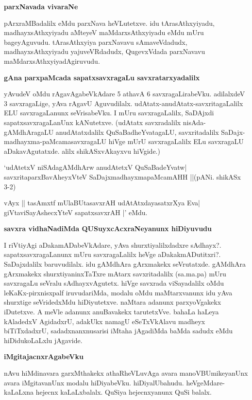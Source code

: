 \textbf{parxNavada vivaraNe} %

pArxraMBadalilx eMdu parxNava heVLutetxve. idu tArasAthxyiyadu, madhayxsAthxyiyadu aMteyeV maMdarxsAthxyiyadu eMdu mUru bageyAguvudu. tArasAthxyiya parxNavavu sAmaveVdadudx, madhayxsAthxyiyadu yajuveVRdadudx, QugevxVdada parxNavavu maMdarxsAthxyiyadAgiruvudu.

\textbf{gAna parxpaMcada sapatxsavxragaLu savxratarxyadalilx}

yAvudeV oMdu rAgavAgabeVkAdare 5 athavA 6 savxragaLirabeVku. adilalxdeV 3 savxragaLige, yAva rAgavU Aguvudilalx. udAtatx-anudAtatx-savxritagaLalilx ELU savxragaLanunx seVrisabeVku. I mUru savxragaLalilx, SaDAjxdi sapatxsavxragaLanUnx kANutetxve. (udAtatx savxradalilx nisAda-gAMdhAragaLU anudAtatxdalilx QuSaBadheYvatagaLU, savxritadalilx SaDajx-madhayxma-paMcamasavxragaLU hiVge mUrU savxragaLalilx ELu savxragaLU aDakavAgutatxde. alilx shikASxvAkayxvu hiVgide.)

\begin{shloka}
`udAtetxV niSAdagAMdhArw anudAtetxV QuSaBadeYvatw|\\
savxritaparxBavAheyxVteV SaDajxmadhayxmapaMcamAHH ||(pANi. shikASx 3-2)
\end{shloka}

\begin{shloka}
vAyx || tasAmxtf mUlaBUtasavxrAH udAtAtxdayasatxrXya Eva|\\
giVtaviSayAshecxYteV sapatxsavxrAH |' eMdu.
\end{shloka}

\textbf{savxra vidhaNadiMda QUSuyxcAcxraNeyanunx hiDiyuvudu}

I riVtiyAgi aDakamADabeVkAdare, yAva shurxtiyalilxdadxre sAdhayx?. sapatxsavxragaLanunx mUru savxragaLalilx heVge aDakakmADutitxri?. SaDajxdalilx baruvudilalx. idu gAMdhAra gArxmakekx seVrutatxde. gAMdhAra gArxmakekx shurxtiyaninxTaTxre mAtarx savxritadalilx (sa.ma.pa) mUru savxragaLu seVralu sAdhayxvAgutetx. hiVge savxrada viSayadalilx oMdu leKaKx-pirxnisxpalf iruvudariMda, modalu oMdu maMtarxvanunx idu yAva shurxtige seVridedxMdu hiDiyutetxve. naMtara adanunx parxyoVgakekx iDutetxve. A meVle adanunx anuBavakekx tarutetxVve. bahaLa haLeya kAladedxV AgidadxrU, adakUkx namagU eSeTxVkAlavu madheyx biTiTxdadxrU, sadadxnanxnusarisi iMtaha jAgadiMda baMda sadudx eMdu hiDidukoLaLxlu jAgavide.

\textbf{iMgitajacnxrAgabeVku}

nAvu hiMdinavara garxMthakekx athaRheVLuvAga avara manoVBUmikeyanUnx avara iMgitavanUnx modalu hiDiyabeVku. hiDiyalUbahudu. heVgeMdare-kaLaLxna hejecnx kaLaLxbalalx. QuSiya hejecnxyanunx QuSi balalx.

